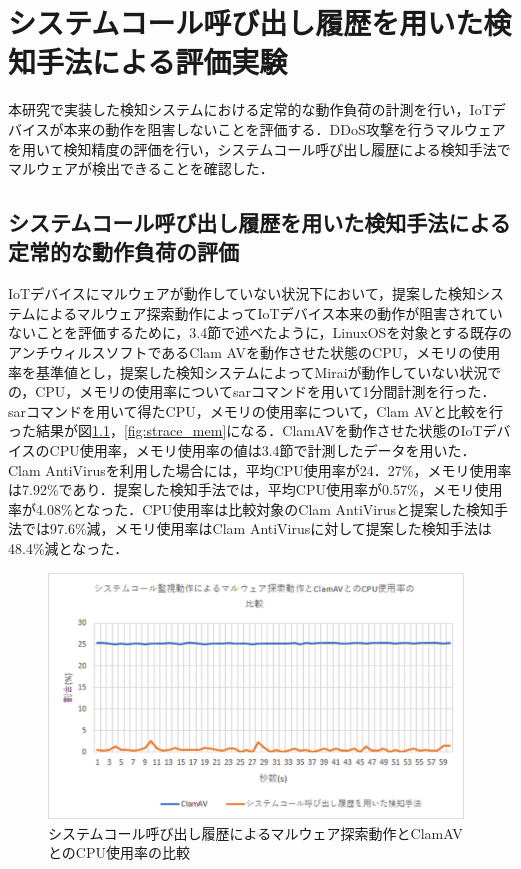 \chapter{システムコール呼び出し履歴を用いた検知手法による評価実験}
本研究で実装した検知システムにおける定常的な動作負荷の計測を行い，IoTデバイスが本来の動作を阻害しないことを評価する．DDoS攻撃を行うマルウェアを用いて検知精度の評価を行い，システムコール呼び出し履歴による検知手法でマルウェアが検出できることを確認した．

\section{システムコール呼び出し履歴を用いた検知手法による定常的な動作負荷の評価}

IoTデバイスにマルウェアが動作していない状況下において，提案した検知システムによるマルウェア探索動作によってIoTデバイス本来の動作が阻害されていないことを評価するために，3.4節で述べたように，LinuxOSを対象とする既存のアンチウィルスソフトであるClam AVを動作させた状態のCPU，メモリの使用率を基準値とし，提案した検知システムによってMiraiが動作していない状況での，CPU，メモリの使用率についてsarコマンドを用いて1分間計測を行った．
sarコマンドを用いて得たCPU，メモリの使用率について，Clam AVと比較を行った結果が図\ref{fig:strace_cpu}，\ref{fig:strace_mem}になる．ClamAVを動作させた状態のIoTデバイスのCPU使用率，メモリ使用率の値は3.4節で計測したデータを用いた．
Clam AntiVirusを利用した場合には，平均CPU使用率が24．27\%，メモリ使用率は7.92\%であり．提案した検知手法では，平均CPU使用率が0.57\%，メモリ使用率が4.08\%となった．CPU使用率は比較対象のClam AntiVirusと提案した検知手法では97.6\%減，メモリ使用率はClam AntiVirusに対して提案した検知手法は48.4\%減となった．


\clearpage
\begin{figure}[h]
    \centering
       \includegraphics[width=110mm]{figures/strace_cpu.eps}
    \caption{システムコール呼び出し履歴によるマルウェア探索動作とClamAVとのCPU使用率の比較}
        \label{fig:strace_cpu}
\end{figure}
  
